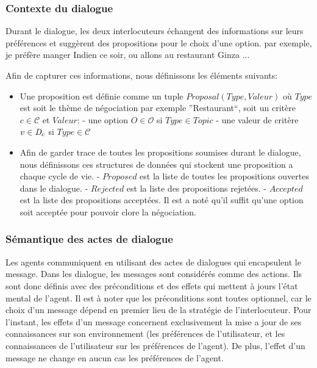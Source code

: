 \documentclass[a4paper,french]{article}
\begin{document}
\subsubsection{Contexte du dialogue}
\par Durant le dialogue, les deux interlocuteurs échangent des informations sur leurs préférences et suggèrent des propositions pour le choix d'une option. par exemple, je préfère manger Indien ce soir, ou allons au restaurant Ginza ...

Afin de capturer ces informations, nous définissons les éléments suivants:
\begin{itemize}
	\item Une proposition est définie comme un tuple $Proposal(Type, Valeur)$ où $Type$ est soit le thème de négociation par exemple ''Restaurant``, soit un critère $c \in \mathcal{C}$ et $Valeur$:
		\subitem -  une option $O \in \mathcal{O}$ si $Type \in Topic$ 
		\subitem - une valeur de critère $v \in \emph{D}_c$ si $Type \in \mathcal{C}$
	\item Afin de garder trace de toutes les propositions soumises durant le dialogue, nous définissons ces structures de données qui stockent une proposition a chaque cycle de vie. 
		\subitem - $ Proposed$ est la liste de toutes les propositions ouvertes dans le dialogue.
		\subitem - $ Rejected$  est la liste des propositions rejetées.
		\subitem - $ Accepted$  est la liste des propositions acceptées. Il est a noté qu'il suffit qu'une option soit acceptée pour pouvoir clore la négociation. 
\end{itemize}
\subsubsection{Sémantique des actes de dialogue}
\par Les agents communiquent en utilisant des actes de dialogues qui encapsulent le message. Dans les dialogue, les messages sont considérés comme des actions. Ils sont donc définis avec des préconditions et des effets qui mettent à jours l'état mental de l'agent. Il est à noter que les préconditions sont toutes optionnel, car le choix d'un message dépend en premier lieu de la stratégie de l'interlocuteur. Pour l'instant, les effets d'un message concernent exclusivement la mise a jour de ses connaissances sur son environnement (les préférences de l'utilisateur, et les connaissances de l'utilisateur sur les préférences de l'agent). De plus, l'effet d'un message ne change en aucun cas les préférences de l'agent. 
\end{document}
